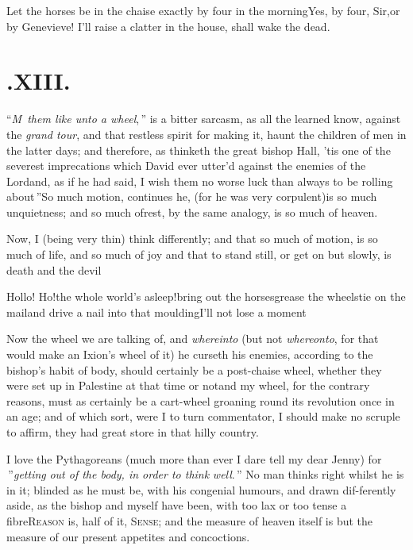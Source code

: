 \documentclass{article}
\begin{document}
Let the horses be in the chaise exactly by four in the
morning\tsh Yes, by four, Sir,\tsh or by
Genevieve! I’ll raise a clatter in the house, shall
wake the dead.

\newpage
\section{.\enspace XIII.}

\lettrine{\lower-10pt\hbox{\large“}\textit{M}}{\,\itshape{}} 
\textit{them like unto a wheel},\,”\break
is a bitter sarcasm, as all the\break
learned know, against the \textit{grand tour}, 
and that restless spirit for making it,\break
{}\break haunt the
children of men in the latter days; and therefore, as thinketh the great bishop
Hall, ’tis one of the se\-ver\-est imprecations which
David ever utter’d against the enemies of the
Lord\tsk and, as if he had said, \lqq I wish them no\break
\lqq worse luck than always to be rolling\break
\lqq about\,”\tsk So much
motion, continues he, (for he was very corpulent)\tsk is so much
unquietness; and so much of\pb rest, by the same analogy, is so much
of heaven.

Now, I (being very thin) think differently; and that so much of
motion, is so much of life, and so much of joy\break
\tsh and
that to stand still, or get on but slowly, is death and the
devil\tsh

Hollo! Ho!\tsh the whole world’s
asleep!\tsh bring out the horses\tsh grease the
wheels\tsh tie on the mail\tsh and drive a nail
into that moulding\tsh I’ll not lose a
moment\tsh

Now the wheel we are talking of, and \textit{whereinto} (but not
\textit{whereonto}, for that would make an Ixion’s wheel of it)
he curseth his enemies, according to the\pb
bishop’s habit of body, should certainly be a post-chaise wheel, whether they were
set up in Palestine at that time or not\tsh and my wheel, for the contrary reasons,
must as certainly be a cart-wheel groaning round its revolution once in an age; and
of which sort, were I to turn commentator, I should make no scruple to affirm, they
had great store in that hilly country.

I love the Pythagoreans (much more than ever I dare tell my dear Jenny) for\break
{}\break
{}\,”\tsh [their] \lqq \textit{getting}\break
\lqq \textit{out of the body, in order to think}\break
\lqq \textit{well}.\,” No man thinks right whilst he is in it; blinded as
he must be, with his congenial humours, and drawn dif-\pb ferently aside, as the bishop
and myself have been, with too lax or too tense a fibre\tsh \textsc{Reason} is,
half of it, \textsc{Sense}; and the measure of heaven itself is but the measure of
our present appetites and concoctions.\tsh
\end{document}
